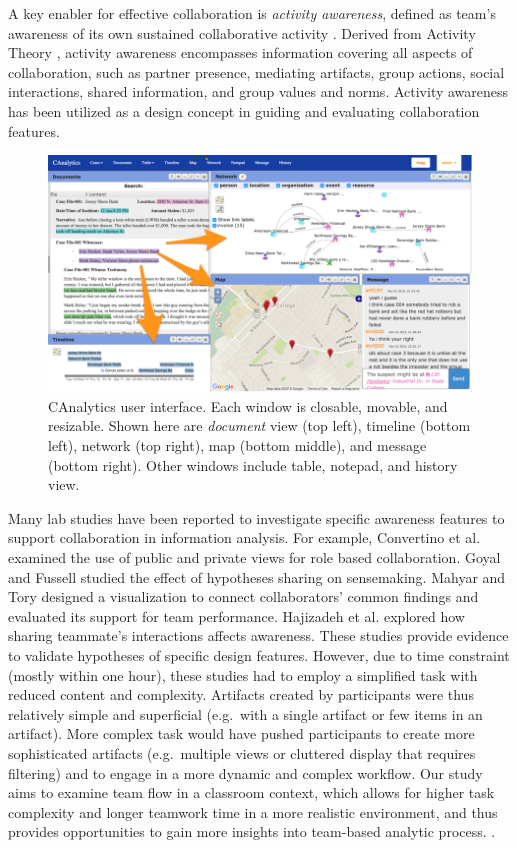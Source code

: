 A key enabler for effective collaboration is \emph{activity awareness}, defined as
team's awareness of its own sustained collaborative activity
\cite{Carroll2003,Carroll2006}. Derived from Activity Theory \cite{Leontev1974},
activity awareness encompasses information covering all aspects of collaboration, such as partner presence, mediating artifacts, group actions, social interactions, shared information, and group values and norms. Activity awareness has been utilized as a design concept in guiding and evaluating collaboration features.

\begin{figure}
\centering
\includegraphics[width=2\columnwidth]{./img/interface.png}
\caption{CAnalytics user interface. Each window is closable, movable, and resizable. Shown here are \emph{document} view (top left), timeline (bottom left), network (top right), map (bottom middle), and message (bottom right). Other windows include table, notepad, and history view. }\label{fig:canalytics}
\end{figure}

Many lab studies have been reported to investigate specific awareness features
to support collaboration in information analysis. For example, Convertino et al.
\cite{Convertino2011} examined the use of public and private views for role
based collaboration. Goyal and Fussell \cite{Goyal2016} studied the effect of
hypotheses sharing on sensemaking. Mahyar and Tory \cite{Mahyar2013b} designed a
visualization to connect collaborators' common findings and evaluated its
support for team performance. Hajizadeh et al. \cite{Hajizadeh2013} explored how
sharing teammate's interactions affects awareness. These studies provide
evidence to validate hypotheses of specific design features. However, due to
time constraint (mostly within one hour), these studies had to employ a
simplified task with reduced content and complexity. Artifacts created by
participants were thus relatively simple and superficial (e.g.~with a single
artifact or few items in an artifact). More complex task would have pushed
participants to create more sophisticated artifacts (e.g.~multiple views or
cluttered display that requires filtering) and to engage in a more dynamic and
complex workflow. Our study aims to examine team flow in a classroom context,
which allows for higher task complexity and longer teamwork time in a more
realistic environment, and thus provides opportunities to gain more insights
into team-based analytic process. .
